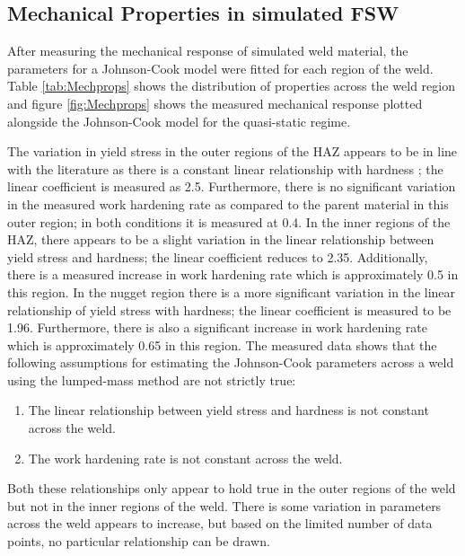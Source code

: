	\subsection{Mechanical Properties in simulated FSW}
	\label{RADMechProps}
	
	After measuring the mechanical response of simulated weld material, the parameters for a Johnson-Cook model were fitted for each region of the weld. Table \ref{tab:Mechprops} shows the distribution of properties across the weld region and figure \ref{fig:Mechprops} shows the measured mechanical response plotted alongside the Johnson-Cook model for the quasi-static regime. 
	
	The variation in yield stress in the outer regions of the HAZ appears to be in line with the literature as there is a constant linear relationship with hardness \cite{McWilliams2013,Grujicic2011a}; the linear coefficient is measured as 2.5. Furthermore, there is no significant variation in the measured work hardening rate as compared to the parent material in this outer region;  in both conditions it is measured at 0.4. 
	In the inner regions of the HAZ, there appears to be a slight variation in the linear relationship between yield stress and hardness; the linear coefficient reduces to 2.35. Additionally, there is a measured increase in work hardening rate which is approximately 0.5 in this region. 
	In the nugget region there is a more significant variation in the linear relationship of yield stress with hardness; the linear coefficient is measured to be 1.96. Furthermore, there is also a significant increase in work hardening rate which is approximately 0.65 in this region. 
	The measured data shows that the following assumptions for estimating the Johnson-Cook parameters across a weld using the lumped-mass method are not strictly true:
	\begin{enumerate}
		\item The linear relationship between yield stress and hardness is not constant across the weld. 
		\item The work hardening rate is not constant across the weld. 
	\end{enumerate}
	Both these relationships only appear to hold true in the outer regions of the weld but not in the inner regions of the weld. There is some variation in parameters across the weld appears to increase, but based on the limited number of data points, no particular relationship can be drawn. 
	
